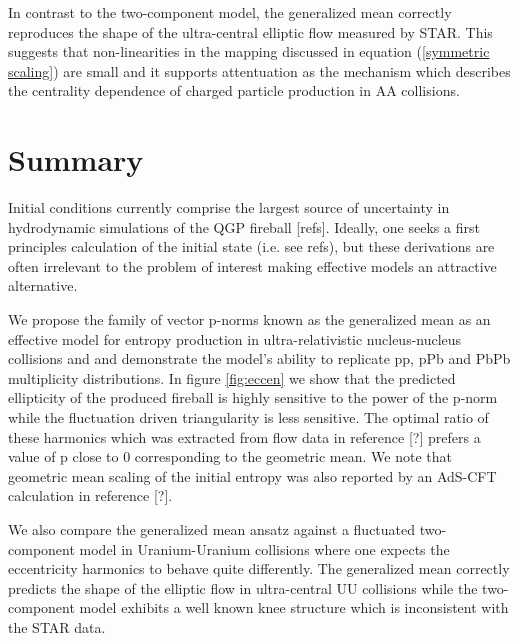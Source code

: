 \documentclass[aps,prl,reprint,amsmath,nofootinbib]{revtex4-1}
\begin{document}
In contrast to the two-component model, the generalized mean correctly reproduces the shape of the ultra-central elliptic flow measured by STAR. This suggests that non-linearities
in the mapping discussed in equation (\ref{symmetric scaling}) are small and it supports attentuation as the mechanism which describes the centrality dependence of charged particle production
in AA collisions.


\section{Summary}

Initial conditions currently comprise the largest source of uncertainty in hydrodynamic simulations of the QGP fireball [refs]. Ideally, one seeks a first principles calculation 
of the initial state (i.e. see refs), but these derivations are often irrelevant to the problem of interest making effective models an attractive alternative.

We propose the family of vector p-norms known as the generalized mean as an effective model for entropy production in ultra-relativistic nucleus-nucleus collisions and and demonstrate the model's
ability to replicate pp, pPb and PbPb multiplicity distributions. In figure \ref{fig:eccen} we show that the predicted ellipticity of the produced fireball is highly sensitive to the power of 
the p-norm while the fluctuation driven triangularity is less sensitive. The optimal ratio of these harmonics which was extracted from flow data in reference [?] prefers a value of p close to 0 
corresponding to the geometric mean. We note that geometric mean scaling of the initial entropy was also reported by an AdS-CFT calculation in reference [?]. 


We also compare the generalized mean ansatz against a fluctuated two-component model in Uranium-Uranium collisions where one expects the eccentricity harmonics to behave quite differently. The generalized mean
correctly predicts the shape of the elliptic flow in ultra-central UU collisions while the two-component model exhibits a well known knee structure which is inconsistent with the STAR data.



\end{document}
